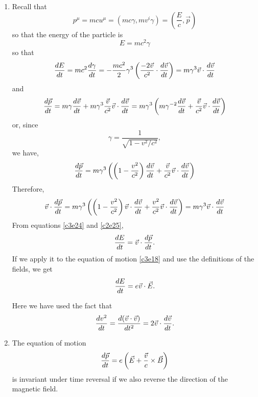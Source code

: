 \begin{enumerate}
\item Recall that 
\begin{equation}\label{c3e22}
p^\mu = mcu^\mu = (mc\gamma, mv^i\gamma) = \left(\frac{E}{c}, \vec{p}\right)
\end{equation}
so that the energy of the particle is
\begin{equation}\label{c3e23}
E = mc^2\gamma
\end{equation}
so that
\begin{equation}\label{c3e24}
\frac{d{E}}{d{t}} = mc^2\frac{d{\gamma}}{d{t}} = 
-\frac{mc^2}{2}\gamma^3\left(\frac{-2\vec{v}}{c^2}\cdot\frac{d{\vec{v}}}{d{t}}\right)
= m\gamma^3 \vec{v}\cdot\frac{d{\vec{v}}}{d{t}}
\end{equation}
and
\[
\frac{d{\vec{p}}}{d{t}} = m\gamma\frac{d{\vec{v}}}{d{t}} + m\gamma^3\frac{\vec{v}}{c^2}\vec{v}\cdot\frac{d{\vec{v}}}{d{t}} = 
m\gamma^3\left(m\gamma^{-2}\frac{d{\vec{v}}}{d{t}} + \frac{\vec{v}}{c^2}\vec{v}\cdot\frac{d{\vec{v}}}{d{t}}\right)
\]
or, since
\[
\gamma = \frac{1}{\sqrt{1 - v^2/c^2}},
\]
we have,
\[
\frac{d{\vec{p}}}{d{t}} = m\gamma^3\left(\left(1 - \frac{v^2}{c^2}\right)\frac{d{\vec{v}}}{d{t}} + 
\frac{\vec{v}}{c^2}\vec{v}\cdot\frac{d{\vec{v}}}{d{t}}\right)
\]
Therefore,
\begin{equation}\label{c3e25}
\vec{v}\cdot\frac{d{\vec{p}}}{d{t}} = m\gamma^3\left(\left(1 - \frac{v^2}{c^2}\right)\vec{v}\cdot\frac{d{\vec{v}}}{d{t}}
+ \frac{v^2}{c^2}\vec{v}\cdot\frac{d{\vec{v}}}{d{t}}\right) = m\gamma^3\vec{v}\cdot\frac{d{\vec{v}}}{d{t}}
\end{equation}
From equations \eqref{c3e24} and \eqref{c2e25},
\begin{equation}\label{c3e26}
\frac{d{E}}{d{t}} = \vec{v}\cdot\frac{d{\vec{p}}}{d{t}}.
\end{equation}
If we apply it to the equation of motion \eqref{c3e18} and use the definitions 
of the fields, we get
\begin{equation}\label{c3e27}
\frac{d{E}}{d{t}} = e\vec{v}\cdot\vec{E}.
\end{equation}

Here we have used the fact that
\begin{equation}\label{c3e28}
\frac{d{v^2}}{d{t}} = \frac{d{(\vec{v}\cdot\vec{v})}}{d{t^2}} = 2\vec{v}\cdot\frac{d{\vec{v}}}{d{t}}.
\end{equation}

\item The equation of motion
\begin{equation}\label{c3e29}
\frac{d{\vec{p}}}{d{t}} = e\left(\vec{E} + \frac{\vec{v}}{c}\times\vec{B}\right)
\end{equation}
is invariant under time reversal if we also reverse the direction of the magnetic
field.


\end{enumerate}
